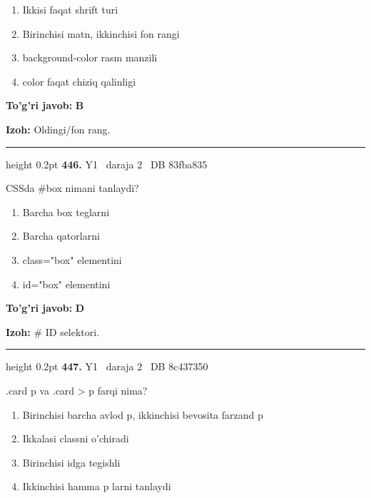 \documentclass[10pt,a4paper,oneside]{article}
\begin{document}
\begin{enumerate}[label=\Alph*),leftmargin=9mm]
\item Ikkisi faqat shrift turi
\item Birinchisi matn, ikkinchisi fon rangi
\item background-color rasm manzili
\item color faqat chiziq qalinligi
\end{enumerate}
\begin{tcolorbox}[enhanced,breakable,colback=teal!4,colframe=teal!45!black,boxrule=0.45pt,arc=1.2mm,left=2.8mm,right=2.8mm,top=2mm,bottom=2mm,before skip=2mm,after skip=2mm]
\textbf{\color{teal}To'g'ri javob:} \textbf{B}
\par\smallskip
\textbf{Izoh:} Oldingi/fon rang.
\end{tcolorbox}
\vspace{2mm}\hrule height 0.2pt \vspace{4mm}
\hypertarget{q446}{\textbf{\color{ink}446.}}  {\color{muted}\scriptsize Y1 \textbullet\ daraja 2 \textbullet\ DB 83fba835}
\par
CSSda \#box nimani tanlaydi?
\begin{enumerate}[label=\Alph*),leftmargin=9mm]
\item Barcha box teglarni
\item Barcha qatorlarni
\item class="box" elementini
\item id="box" elementini
\end{enumerate}
\begin{tcolorbox}[enhanced,breakable,colback=teal!4,colframe=teal!45!black,boxrule=0.45pt,arc=1.2mm,left=2.8mm,right=2.8mm,top=2mm,bottom=2mm,before skip=2mm,after skip=2mm]
\textbf{\color{teal}To'g'ri javob:} \textbf{D}
\par\smallskip
\textbf{Izoh:} \# ID selektori.
\end{tcolorbox}
\vspace{2mm}\hrule height 0.2pt \vspace{4mm}
\hypertarget{q447}{\textbf{\color{ink}447.}}  {\color{muted}\scriptsize Y1 \textbullet\ daraja 2 \textbullet\ DB 8c437350}
\par
.card p va .card \textgreater{} p farqi nima?
\begin{enumerate}[label=\Alph*),leftmargin=9mm]
\item Birinchisi barcha avlod p, ikkinchisi bevosita farzand p
\item Ikkalasi classni o'chiradi
\item Birinchisi idga tegishli
\item Ikkinchisi hamma p larni tanlaydi
\end{enumerate}
\end{document}
